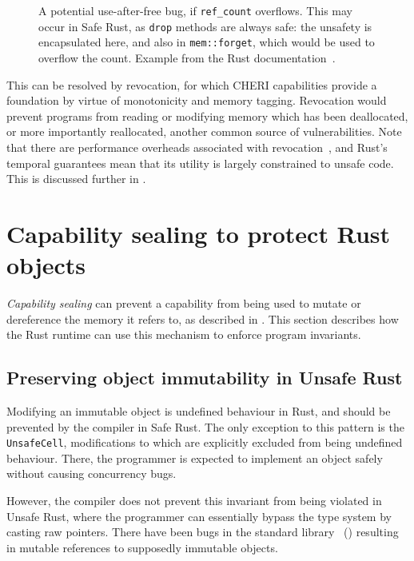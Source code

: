 \documentclass[dissertation.tex]{subfiles}
\begin{document}
\begin{figure}[ht]
    
    \caption{
        A potential use-after-free bug, if \texttt{ref\_count}
        overflows.
        This may occur in Safe Rust, as \texttt{drop} methods are always
        safe: the unsafety is encapsulated here, and also in
        \texttt{mem::forget}, which would be used to overflow the count.
        Example from the Rust documentation~\cite{rust-nomicon-rc-leak}.
    }
    \label{lst:eval-rust-rc-drop}
\end{figure}

This can be resolved by revocation, for which CHERI capabilities provide
a foundation by virtue of monotonicity and memory tagging.
Revocation would prevent programs from reading or modifying memory which
has been deallocated, or more importantly reallocated, another common
source of vulnerabilities.
Note that there are performance overheads associated with
revocation~\cite{cheri-v6}, and Rust's temporal guarantees mean that its
utility is largely constrained to unsafe code.
This is discussed further in .


\section{Capability sealing to protect Rust objects}
\label{sec:eval-sealing}

\emph{Capability sealing} can prevent a capability from being used to
mutate or dereference the memory it refers to, as described in
.
This section describes how the Rust runtime can use this mechanism to
enforce program invariants.

\subsection{Preserving object immutability in Unsafe Rust}
\label{sec:eval-rust-enforce-immut}

Modifying an immutable object is undefined behaviour in Rust, and should
be prevented by the compiler in Safe Rust.
The only exception to this pattern is the \texttt{UnsafeCell},
modifications to which are explicitly excluded from being undefined
behaviour.
There, the programmer is expected to implement an object safely without
causing concurrency bugs.

However, the compiler does not prevent this invariant from being
violated in Unsafe Rust, where the programmer can essentially bypass the
type system by casting raw pointers.
There have been bugs in the standard library~\cite{rust-issue-vec-mut}
() resulting in mutable references to
supposedly immutable objects.
\end{document}
